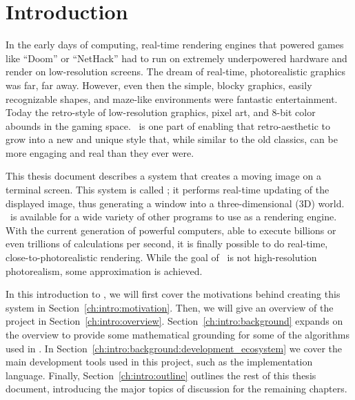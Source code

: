 %
%

\chapter{Introduction}
\label{ch:intro}

In the early days of computing, real-time rendering engines that powered games like ``Doom'' or ``NetHack'' had to run on extremely underpowered hardware and render on low-resolution screens.
The dream of real-time, photorealistic graphics was far, far away.
However, even then the simple, blocky graphics, easily recognizable shapes, and maze-like environments were fantastic entertainment.
Today the retro-style of low-resolution graphics, pixel art, and 8-bit color abounds in the gaming space.
\name\ is one part of enabling that retro-aesthetic to grow into a new and unique style that, while similar to the old classics, can be more engaging and real than they ever were.

This thesis document describes a system that creates a moving image on a terminal screen.
This system is called \name; it performs real-time updating of the displayed image, thus generating a window into a three-dimensional (3D) world.
\name\ is available for a wide variety of other programs to use as a rendering engine.
With the current generation of powerful computers, able to execute billions or even trillions of calculations per second, it is finally possible to do real-time, close-to-photorealistic rendering.
While the goal of \name\ is not high-resolution photorealism, some approximation is achieved.

In this introduction to \name, we will first cover the motivations behind creating this system in Section~\ref{ch:intro:motivation}.
Then, we will give an overview of the project in Section~\ref{ch:intro:overview}.
Section~\ref{ch:intro:background} expands on the overview to provide some mathematical grounding for some of the algorithms used in \name.
In Section~\ref{ch:intro:background:development_ecosystem} we cover the main development tools used in this project, such as the implementation language.
Finally, Section~\ref{ch:intro:outline} outlines the rest of this thesis document, introducing the major topics of discussion for the remaining chapters.

